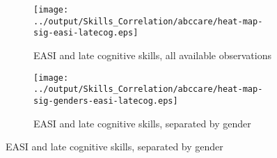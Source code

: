     \clearpage
    \begin{figure}[H]
      \ContinuedFloat \centering
      \begin{subfigure}{0.85\textwidth}  
        \centering
        \caption{EASI and late cognitive skills, all available observations}
        \texttt{[image: ../output/Skills\_Correlation/abccare/heat-map-sig-easi-latecog.eps]}
        \label{fig:easi-latecog-nogender}
      \end{subfigure}

      \begin{subfigure}{0.85\textwidth}  
        \centering
        \caption{EASI and late cognitive skills, separated by gender}
        \texttt{[image: ../output/Skills\_Correlation/abccare/heat-map-sig-genders-easi-latecog.eps]}
        \label{fig:easi-latecog-gender}
      \end{subfigure}
    \end{figure}

